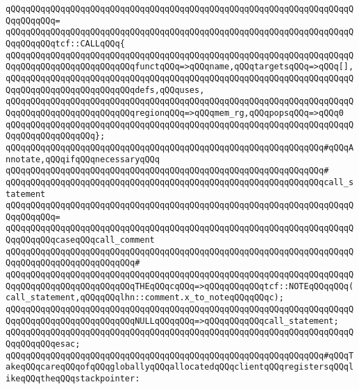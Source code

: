 \verb|qQQqqQQqqQQqqQQqqQQqqQQqqQQqqQQqqQQqqQQqqQQqqQQqqQQqqQQqqQQqqQQqqQQqqQQqqQQqqQQq=|\newline
\verb|qQQqqQQqqQQqqQQqqQQqqQQqqQQqqQQqqQQqqQQqqQQqqQQqqQQqqQQqqQQqqQQqqQQqqQQqqQQqqQQqtcf::CALLqQQq{|\newline
\verb|qQQqqQQqqQQqqQQqqQQqqQQqqQQqqQQqqQQqqQQqqQQqqQQqqQQqqQQqqQQqqQQqqQQqqQQqqQQqqQQqqQQqqQQqqQQqqQQqfunctqQQq=>qQQqname,qQQqtargetsqQQq=>qQQq[],|\newline
\verb|qQQqqQQqqQQqqQQqqQQqqQQqqQQqqQQqqQQqqQQqqQQqqQQqqQQqqQQqqQQqqQQqqQQqqQQqqQQqqQQqqQQqqQQqqQQqqQQqdefs,qQQquses,|\newline
\verb|qQQqqQQqqQQqqQQqqQQqqQQqqQQqqQQqqQQqqQQqqQQqqQQqqQQqqQQqqQQqqQQqqQQqqQQqqQQqqQQqqQQqqQQqqQQqqQQqregionqQQq=>qQQqmem_rg,qQQqpopsqQQq=>qQQq0|\newline
\verb|qQQqqQQqqQQqqQQqqQQqqQQqqQQqqQQqqQQqqQQqqQQqqQQqqQQqqQQqqQQqqQQqqQQqqQQqqQQqqQQqqQQqqQQq};|\newline
\newline
\verb|qQQqqQQqqQQqqQQqqQQqqQQqqQQqqQQqqQQqqQQqqQQqqQQqqQQqqQQqqQQqqQQq#qQQqAnnotate,qQQqifqQQqnecessaryqQQq|\newline
\verb|qQQqqQQqqQQqqQQqqQQqqQQqqQQqqQQqqQQqqQQqqQQqqQQqqQQqqQQqqQQqqQQq#|\newline
\verb|qQQqqQQqqQQqqQQqqQQqqQQqqQQqqQQqqQQqqQQqqQQqqQQqqQQqqQQqqQQqqQQqcall_statement|\newline
\verb|qQQqqQQqqQQqqQQqqQQqqQQqqQQqqQQqqQQqqQQqqQQqqQQqqQQqqQQqqQQqqQQqqQQqqQQqqQQqqQQq=|\newline
\verb|qQQqqQQqqQQqqQQqqQQqqQQqqQQqqQQqqQQqqQQqqQQqqQQqqQQqqQQqqQQqqQQqqQQqqQQqqQQqqQQqcaseqQQqcall_comment|\newline
\verb|qQQqqQQqqQQqqQQqqQQqqQQqqQQqqQQqqQQqqQQqqQQqqQQqqQQqqQQqqQQqqQQqqQQqqQQqqQQqqQQqqQQqqQQqqQQqqQQq#|\newline
\verb|qQQqqQQqqQQqqQQqqQQqqQQqqQQqqQQqqQQqqQQqqQQqqQQqqQQqqQQqqQQqqQQqqQQqqQQqqQQqqQQqqQQqqQQqqQQqqQQqTHEqQQqcqQQq=>qQQqqQQqqQQqtcf::NOTEqQQqqQQq(call_statement,qQQqqQQqlhn::comment.x_to_noteqQQqqQQqc);|\newline
\verb|qQQqqQQqqQQqqQQqqQQqqQQqqQQqqQQqqQQqqQQqqQQqqQQqqQQqqQQqqQQqqQQqqQQqqQQqqQQqqQQqqQQqqQQqqQQqqQQqNULLqQQqqQQq=>qQQqqQQqqQQqcall_statement;|\newline
\verb|qQQqqQQqqQQqqQQqqQQqqQQqqQQqqQQqqQQqqQQqqQQqqQQqqQQqqQQqqQQqqQQqqQQqqQQqqQQqqQQqesac;|\newline
\newline
\newline
\verb|qQQqqQQqqQQqqQQqqQQqqQQqqQQqqQQqqQQqqQQqqQQqqQQqqQQqqQQqqQQqqQQq#qQQqTakeqQQqcareqQQqofqQQqgloballyqQQqallocatedqQQqclientqQQqregistersqQQqlikeqQQqtheqQQqstackpointer:|\newline
